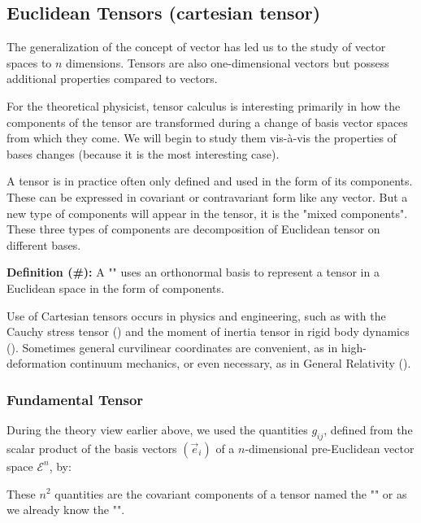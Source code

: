	\subsection{Euclidean Tensors (cartesian tensor)}
	The generalization of the concept of vector has led us to the study of vector spaces to $n$ dimensions. Tensors are also one-dimensional vectors but possess additional properties compared to vectors.

	For the theoretical physicist, tensor calculus is interesting primarily in how the components of the tensor are transformed during a change of basis vector spaces from which they come. We will begin to study them vis-à-vis the properties of bases changes (because it is the most interesting case).

	A tensor is in practice often only defined and used in the form of its components. These can be expressed in covariant or contravariant form like any vector. But a new type of components will appear in the tensor, it is the "mixed components". These three types of components are decomposition of Euclidean tensor on different bases.
	
	\textbf{Definition (\#\mydef):} A "" uses an orthonormal basis to represent a tensor in a Euclidean space in the form of components.

	Use of Cartesian tensors occurs in physics and engineering, such as with the Cauchy stress tensor () and the moment of inertia tensor in rigid body dynamics (). Sometimes general curvilinear coordinates are convenient, as in high-deformation continuum mechanics, or even necessary, as in General Relativity ().
	
	\subsubsection{Fundamental Tensor}
	During the theory view earlier above, we used the quantities $g_{ij}$, defined from the scalar product of the basis vectors $(\vec{e}_i)$ of a $n$-dimensional pre-Euclidean  vector space $\mathcal{E}^n$, by:
	
	These $n^2$ quantities are the covariant components of a tensor named the "" or as we already know the "".
	
